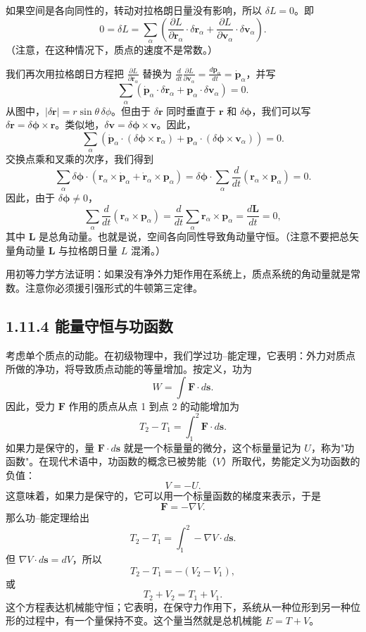 如果空间是各向同性的，转动对拉格朗日量没有影响，所以 $\delta L = 0$。即
$$
0 = \delta L = \sum_{\alpha}\left(\frac{\partial L}{\partial \mathbf{r}_\alpha}\cdot\delta\mathbf{r}_\alpha + \frac{\partial L}{\partial \mathbf{v}_\alpha}\cdot\delta\mathbf{v}_\alpha\right).
$$
（注意，在这种情况下，质点的速度不是常数。）

我们再次用拉格朗日方程把 $\frac{\partial L}{\partial \mathbf{r}_\alpha}$ 替换为 $\frac{d}{dt}\frac{\partial L}{\partial \mathbf{v}_\alpha} = \frac{d\mathbf{p}_\alpha}{dt} = \dot{\mathbf{p}}_\alpha$，并写
$$
\sum_{\alpha}\left(\dot{\mathbf{p}}_\alpha\cdot\delta\mathbf{r}_\alpha + \mathbf{p}_\alpha\cdot\delta\mathbf{v}_\alpha\right) = 0.
$$
从图中，$|\delta\mathbf{r}| = r\sin\theta\,\delta\phi$。但由于 $\delta\mathbf{r}$ 同时垂直于 $\mathbf{r}$ 和 $\delta\boldsymbol{\phi}$，我们可以写 $\delta\mathbf{r} = \delta\boldsymbol{\phi}\times\mathbf{r}$。类似地，$\delta\mathbf{v} = \delta\boldsymbol{\phi}\times\mathbf{v}$。因此，
$$
\sum_{\alpha}\left(\dot{\mathbf{p}}_\alpha\cdot(\delta\boldsymbol{\phi}\times\mathbf{r}_\alpha) + \mathbf{p}_\alpha\cdot(\delta\boldsymbol{\phi}\times\mathbf{v}_\alpha)\right) = 0.
$$
交换点乘和叉乘的次序，我们得到
$$
\sum_{\alpha}\delta\boldsymbol{\phi}\cdot\left(\mathbf{r}_\alpha\times\dot{\mathbf{p}}_\alpha + \dot{\mathbf{r}}_\alpha\times\mathbf{p}_\alpha\right) = \delta\boldsymbol{\phi}\cdot\sum_{\alpha}\frac{d}{dt}\left(\mathbf{r}_\alpha\times\mathbf{p}_\alpha\right) = 0.
$$
因此，由于 $\delta\boldsymbol{\phi} \neq 0$，
$$
\sum_{\alpha}\frac{d}{dt}(\mathbf{r}_\alpha\times\mathbf{p}_\alpha) = \frac{d}{dt}\sum_{\alpha}\mathbf{r}_\alpha\times\mathbf{p}_\alpha = \frac{d\mathbf{L}}{dt} = 0,
$$
其中 $\mathbf{L}$ 是总角动量。也就是说，空间各向同性导致角动量守恒。（注意不要把总矢量角动量 $\mathbf{L}$ 与拉格朗日量 $L$ 混淆。）

\begin{exercise}
用初等力学方法证明：如果没有净外力矩作用在系统上，质点系统的角动量就是常数。注意你必须援引强形式的牛顿第三定律。
\end{exercise}

\subsection*{1.11.4  能量守恒与功函数}

考虑单个质点的动能。在初级物理中，我们学过功--能定理，它表明：外力对质点所做的净功，将导致质点动能的等量增加。按定义，功为
$$
W = \int \mathbf{F}\cdot d\mathbf{s}.
$$
因此，受力 $\mathbf{F}$ 作用的质点从点 1 到点 2 的动能增加为
$$
T_2 - T_1 = \int_1^2 \mathbf{F}\cdot d\mathbf{s}.
$$
如果力是保守的，量 $\mathbf{F}\cdot d\mathbf{s}$ 就是一个标量量的微分，这个标量量记为 $U$，称为"功函数"。在现代术语中，功函数的概念已被势能（$V$）所取代，势能定义为功函数的负值：
$$
V = -U.
$$
这意味着，如果力是保守的，它可以用一个标量函数的梯度来表示，于是
$$
\mathbf{F} = -\nabla V.
$$
那么功--能定理给出
$$
T_2 - T_1 = \int_1^2 -\nabla V\cdot d\mathbf{s}.
$$
但 $\nabla V\cdot d\mathbf{s} = dV$，所以
$$
T_2 - T_1 = -(V_2 - V_1),
$$
或
$$
T_2 + V_2 = T_1 + V_1.
$$
这个方程表达机械能守恒；它表明，在保守力作用下，系统从一种位形到另一种位形的过程中，有一个量保持不变。这个量当然就是总机械能 $E = T + V$。

